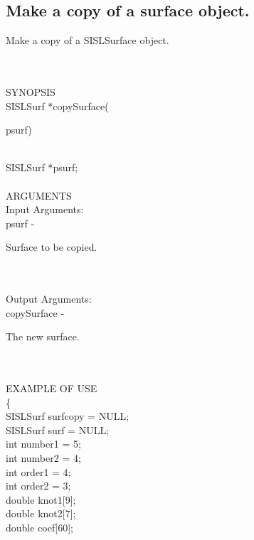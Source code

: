 \subsection{Make a copy of a surface object.}
\begin{minipg1}
  Make a copy of a SISLSurface object.
\end{minipg1}\\ \\
SYNOPSIS\\
        \>SISLSurf *copySurface(\begin{minipg3}
          {\fov psurf})
        \end{minipg3}\\[0.3ex]
        \>\>    SISLSurf *{\fov psurf};\\
\\
ARGUMENTS\\
        \>Input Arguments:\\
        \>\>    {\fov psurf}\> - \>  \begin{minipg2}
                      Surface to be copied.
                               \end{minipg2}\\
\\
        \>Output Arguments:\\
        \>\>    {\fov copySurface}\> - \>  \begin{minipg2}
                     The new surface.
                               \end{minipg2}\\
\\
EXAMPLE OF USE\\
        \>      \{ \\
        \>\>    SISLSurf\>      {\fov *surfcopy} = NULL;\\
        \>\>    SISLSurf\>      {\fov *surf} = NULL;\\
        \>\>    int    \>       {\fov number1} = 5;\\
        \>\>    int    \>       {\fov number2} = 4;\\
        \>\>    int    \>       {\fov order1} = 4;\\
        \>\>    int    \>       {\fov order2} = 3;\\
        \>\>    double \>       {\fov knot1}[9];\\
        \>\>    double \>       {\fov knot2}[7];\\
        \>\>    double \>       {\fov coef}[60];\\
